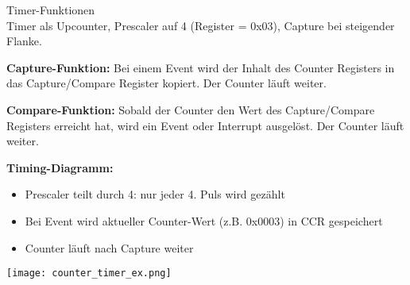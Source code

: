 \begin{example2}{Timer-Funktionen}\\
    Timer als Upcounter, Prescaler auf 4 (Register = 0x03), Capture bei steigender Flanke.
    
    \tcblower
    
    \textbf{Capture-Funktion:}
    Bei einem Event wird der Inhalt des Counter Registers in das Capture/Compare Register kopiert. Der Counter läuft weiter.
    
    \textbf{Compare-Funktion:}
    Sobald der Counter den Wert des Capture/Compare Registers erreicht hat, wird ein Event oder Interrupt ausgelöst. Der Counter läuft weiter.
    
    \textbf{Timing-Diagramm:}
    \begin{itemize}
        \item Prescaler teilt durch 4: nur jeder 4. Puls wird gezählt
        \item Bei Event wird aktueller Counter-Wert (z.B. 0x0003) in CCR gespeichert
        \item Counter läuft nach Capture weiter
    \end{itemize}
    \texttt{[image: counter\_timer\_ex.png]}
\end{example2}

